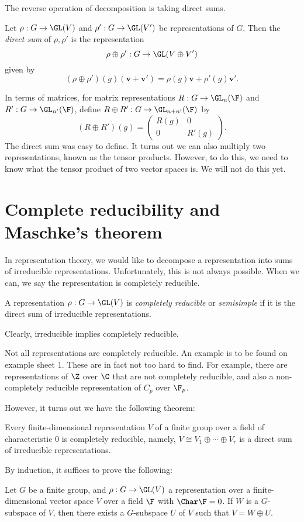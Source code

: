 \documentclass[a4paper]{article}
\begin{document}
The reverse operation of decomposition is taking direct sums.
\begin{defi}
  Let $\rho: G\to \GL(V)$ and $\rho': G \to \GL(V')$ be representations of $G$. Then the \emph{direct sum} of $\rho, \rho'$ is the representation
  \[
    \rho \oplus \rho': G \to \GL(V \oplus V')
  \]
  given by
  \[
    (\rho \oplus \rho')(g)(\mathbf{v} + \mathbf{v}') = \rho(g) \mathbf{v} + \rho'(g) \mathbf{v}'.
  \]
\end{defi}
In terms of matrices, for matrix representations $R: G \to \GL_n(\F)$ and $R': G \to \GL_{n'}(\F)$, define $R \oplus R': G \to \GL_{n + n'}(\F)$ by
\[
  (R\oplus R') (g) =
  \begin{pmatrix}
    R(g) & 0\\
    0 & R'(g)
  \end{pmatrix}.
\]
The direct sum was easy to define. It turns out we can also multiply two representations, known as the tensor products. However, to do this, we need to know what the tensor product of two vector spaces is. We will not do this yet.

\section{Complete reducibility and Maschke's theorem}
In representation theory, we would like to decompose a representation into sums of irreducible representations. Unfortunately, this is not always possible. When we can, we say the representation is completely reducible.

\begin{defi}
  A representation $\rho: G \to \GL(V)$ is \emph{completely reducible} or \emph{semisimple} if it is the direct sum of irreducible representations.
\end{defi}
Clearly, irreducible implies completely reducible.

Not all representations are completely reducible. An example is to be found on example sheet 1. These are in fact not too hard to find. For example, there are representations of $\Z$ over $\C$ that are not completely reducible, and also a non-completely reducible representation of $C_p$ over $\F_p$.

However, it turns out we have the following theorem:
\begin{thm}
  Every finite-dimensional representation $V$ of a finite group over a field of characteristic $0$ is completely reducible, namely, $V \cong V_1 \oplus \cdots \oplus V_r$ is a direct sum of irreducible representations.
\end{thm}
By induction, it suffices to prove the following:
\begin{thm}
  Let $G$ be a finite group, and $\rho: G \to \GL(V)$ a representation over a finite-dimensional vector space $V$ over a field $\F $ with $\Char \F = 0$. If $W$ is a $G$-subspace of $V$, then there exists a $G$-subspace $U$ of $V$ such that $V = W \oplus U$.
\end{thm}
\end{document}
